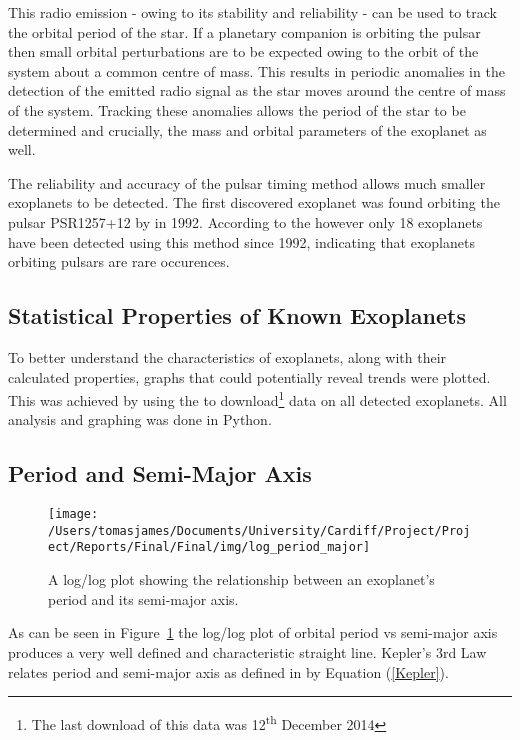 \documentclass{report}
\begin{document}
This radio emission - owing to its stability and reliability - can be used to track the orbital period of the star. If a planetary companion is orbiting the pulsar then small orbital perturbations are to be expected owing to the orbit of the system about a common centre of mass. This results in periodic anomalies in the detection of the emitted radio signal as the star moves around the centre of mass of the system. Tracking these anomalies allows the period of the star to be determined and crucially, the mass and orbital parameters of the exoplanet as well.

The reliability and accuracy of the pulsar timing method allows much smaller exoplanets to be detected. The first discovered exoplanet was found orbiting the pulsar PSR1257+12 by \citeauthor{first} in 1992. According to the \textcite{exo} however only 18 exoplanets have been detected using this method since 1992, indicating that exoplanets orbiting pulsars are rare occurences.



\subsection{Statistical Properties of Known Exoplanets}
To better understand the characteristics of exoplanets, along with their calculated properties, graphs that could potentially reveal trends were plotted. This was achieved by using the \textcite{exo} to download\footnote{The last download of this data was 12\textsuperscript{th} December 2014} data on all detected exoplanets. All analysis and graphing was done in Python.

\subsection*{Period and Semi-Major Axis}
\begin{figure}[H]
\centering
    \texttt{[image: /Users/tomasjames/Documents/University/Cardiff/Project/Project/Reports/Final/Final/img/log\_period\_major]}
\caption{A log/log plot showing the relationship between an exoplanet's period and its semi-major axis.}\label{log_period_major}
\end{figure}

As can be seen in Figure~\ref{log_period_major} the log/log plot of orbital period vs semi-major axis produces a very well defined and characteristic straight line. Kepler's 3rd Law relates period and semi-major axis as defined in \textcite{haswell} by Equation (\ref{Kepler}).
\end{document}
